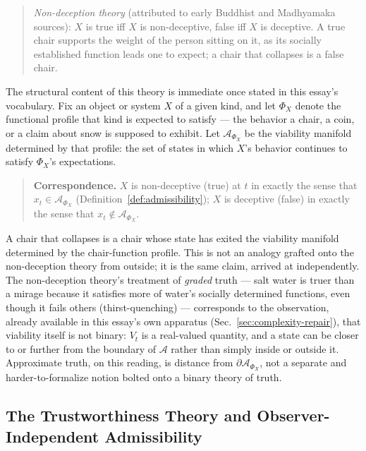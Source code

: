 \documentclass[11pt,a4paper]{article}
\theoremstyle{plain}
\theoremstyle{definition}
\theoremstyle{remark}
\newcommand{\Adm}{\mathcal{A}}
\begin{document}
\begin{quote}
\emph{Non-deception theory} (attributed to early Buddhist and Madhyamaka sources): $X$ is true iff $X$ is non-deceptive, false iff $X$ is deceptive. A true chair supports the weight of the person sitting on it, as its socially established function leads one to expect; a chair that collapses is a false chair.
\end{quote}

The structural content of this theory is immediate once stated in this essay's vocabulary. Fix an object or system $X$ of a given kind, and let $\Phi_X$ denote the functional profile that kind is expected to satisfy — the behavior a chair, a coin, or a claim about snow is supposed to exhibit. Let $\Adm_{\Phi_X}$ be the viability manifold determined by that profile: the set of states in which $X$'s behavior continues to satisfy $\Phi_X$'s expectations.

\begin{quote}
\textbf{Correspondence.} $X$ is non-deceptive (true) at $t$ in exactly the sense that $x_t \in \Adm_{\Phi_X}$ (Definition~\ref{def:admissibility}); $X$ is deceptive (false) in exactly the sense that $x_t \notin \Adm_{\Phi_X}$.
\end{quote}

A chair that collapses is a chair whose state has exited the viability manifold determined by the chair-function profile. This is not an analogy grafted onto the non-deception theory from outside; it is the same claim, arrived at independently. The non-deception theory's treatment of \emph{graded} truth — salt water is truer than a mirage because it satisfies more of water's socially determined functions, even though it fails others (thirst-quenching) — corresponds to the observation, already available in this essay's own apparatus (Sec.~\ref{sec:complexity-repair}), that viability itself is not binary: $V_t$ is a real-valued quantity, and a state can be closer to or further from the boundary of $\Adm$ rather than simply inside or outside it. Approximate truth, on this reading, is distance from $\partial\Adm_{\Phi_X}$, not a separate and harder-to-formalize notion bolted onto a binary theory of truth.

\subsection{The Trustworthiness Theory and Observer-Independent Admissibility}
\label{subsec:trustworthiness-objective}
\end{document}
